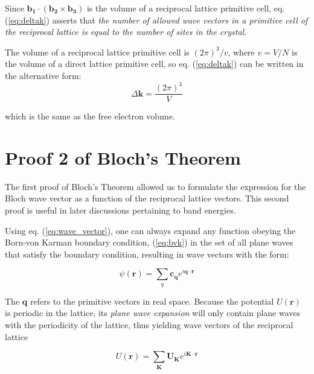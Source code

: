 	Since $\mathbf{b_1} \cdot (\mathbf{b_2} \times \mathbf{b_3})$ is the volume of a reciprocal lattice primitive cell, eq. (\ref{eq:deltak}) asserts that \emph{the number of allowed wave vectors in a primitive cell of the reciprocal lattice is equal to the number of sites in the crystal}.

	The volume of a reciprocal lattice primitive cell is $(2π)^3/v$, where $v=V/N$ is the volume of a direct lattice primitive cell, so eq. (\ref{eq:deltak}) can be written in the alternative form:
	\begin{equation} \label{eq:freedeltak}
		\Delta \mathbf{k}
		=
		\frac{(2 \pi)^3}{V}
	\end{equation}

	which is the same as the free electron volume.

\section{Proof 2 of Bloch's Theorem}
	The first proof of Bloch's Theorem allowed us to formulate the expression for the Bloch wave vector as a function of the reciprocal lattice vectors.  This second proof is useful in later discussions pertaining to band energies.

	Using eq. (\ref{eq:wave_vector}), one can always expand any function obeying the Born-von Karman boundary condition, (\ref{eq:bvk}) in the set of all plane waves that satisfy the boundary condition, resulting in wave vectors with the form:

	\begin{equation} \label{eq:waves_q}
		\psi(\mathbf{r})
		=
		\sum_{q}
		\mathbf{c_q}
		e^{i\mathbf{q} \cdot \mathbf{r}}
	\end{equation}

	The $\mathbf{q}$ refers to the primitive vectors in real space.  Because the potential $U(\mathbf{r})$ is periodic in the lattice, its \emph{plane wave expansion} will only contain plane waves with the periodicity of the lattice, thus yielding wave vectors of the reciprocal lattice

	\begin{equation} \label{eq:U(r)}
		U(\mathbf{r})
		=
		\sum_{\mathbf{K}}
		\mathbf{U_K}
		e^{i \mathbf{K} \cdot \mathbf{r}}
	\end{equation}

